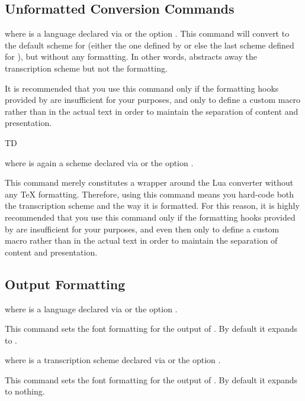 \documentclass{ltxdockit}
\begin{document}
\subsection{Unformatted Conversion Commands}

\begin{ltxsyntax}

  where  is a language declared via
   or the option . This
  command will convert  to the default scheme for  (either
  the one defined by  or else the last scheme defined for
  ), but without any formatting. In other words,
   abstracts away the transcription scheme but
  not the formatting.

  It is recommended that you use this command only if the formatting hooks
  provided by  are insufficient for your purposes, and only to
  define a custom macro rather than in the actual text in order to maintain the
  separation of content and presentation.

  TD


  where  is again a scheme declared via
   or the option .

  This command merely constitutes a wrapper around the Lua converter without any
  \TeX{} formatting. Therefore, using this command means you hard-code both the
  transcription scheme and the way it is formatted.  For this reason, it is
  highly recommended that you use this command only if the formatting hooks
  provided by  are insufficient for your purposes, and even then
  only to define a custom macro rather than in the actual text in order to
  maintain the separation of content and presentation.

\end{ltxsyntax}

\subsection{Output Formatting}

\begin{ltxsyntax}

  where  is a language declared via
   or the option .

  This command sets the font formatting for the output of
  . By default it expands to
  .


  where  is a transcription scheme declared via
   or the option .

  This command sets the font formatting for the output of
  . By default it expands to nothing.

\end{ltxsyntax}
\end{document}
